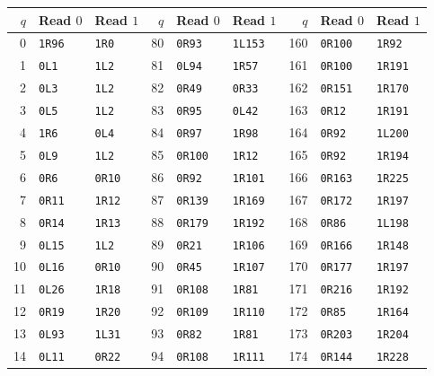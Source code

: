 \small
\begin{longtable}{rll@{\hspace{0.45cm}}rll@{\hspace{0.45cm}}rll}
\toprule
$q$ & Read $0$ & Read $1$ & $q$ & Read $0$ & Read $1$ & $q$ & Read $0$ & Read $1$ \\
\midrule\endhead
0 & \texttt{1R96} & \texttt{1R0} & 80 & \texttt{0R93} & \texttt{1L153} & 160 & \texttt{0R100} & \texttt{1R92} \\
1 & \texttt{0L1} & \texttt{1L2} & 81 & \texttt{0L94} & \texttt{1R57} & 161 & \texttt{0R100} & \texttt{1R191} \\
2 & \texttt{0L3} & \texttt{1L2} & 82 & \texttt{0R49} & \texttt{0R33} & 162 & \texttt{0R151} & \texttt{1R170} \\
3 & \texttt{0L5} & \texttt{1L2} & 83 & \texttt{0R95} & \texttt{0L42} & 163 & \texttt{0R12} & \texttt{1R191} \\
4 & \texttt{1R6} & \texttt{0L4} & 84 & \texttt{0R97} & \texttt{1R98} & 164 & \texttt{0R92} & \texttt{1L200} \\
5 & \texttt{0L9} & \texttt{1L2} & 85 & \texttt{0R100} & \texttt{1R12} & 165 & \texttt{0R92} & \texttt{1R194} \\
6 & \texttt{0R6} & \texttt{0R10} & 86 & \texttt{0R92} & \texttt{1R101} & 166 & \texttt{0R163} & \texttt{1R225} \\
7 & \texttt{0R11} & \texttt{1R12} & 87 & \texttt{0R139} & \texttt{1R169} & 167 & \texttt{0R172} & \texttt{1R197} \\
8 & \texttt{0R14} & \texttt{1R13} & 88 & \texttt{0R179} & \texttt{1R192} & 168 & \texttt{0R86} & \texttt{1L198} \\
9 & \texttt{0L15} & \texttt{1L2} & 89 & \texttt{0R21} & \texttt{1R106} & 169 & \texttt{0R166} & \texttt{1R148} \\
10 & \texttt{0L16} & \texttt{0R10} & 90 & \texttt{0R45} & \texttt{1R107} & 170 & \texttt{0R177} & \texttt{1R197} \\
11 & \texttt{0L26} & \texttt{1R18} & 91 & \texttt{0R108} & \texttt{1R81} & 171 & \texttt{0R216} & \texttt{1R192} \\
12 & \texttt{0R19} & \texttt{1R20} & 92 & \texttt{0R109} & \texttt{1R110} & 172 & \texttt{0R85} & \texttt{1R164} \\
13 & \texttt{0L93} & \texttt{1L31} & 93 & \texttt{0R82} & \texttt{1R81} & 173 & \texttt{0R203} & \texttt{1R204} \\
14 & \texttt{0L11} & \texttt{0R22} & 94 & \texttt{0R108} & \texttt{1R111} & 174 & \texttt{0R144} & \texttt{1R228} \\

\end{longtable}
